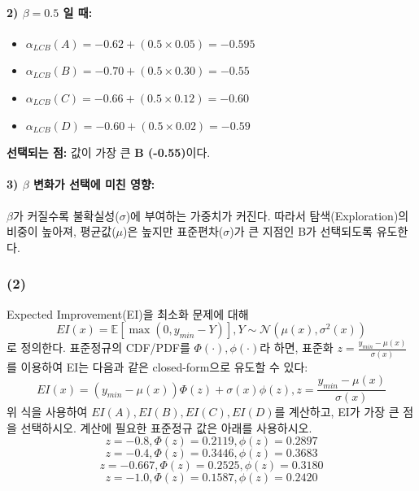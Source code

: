\documentclass[11pt]{article}
\begin{document}
\paragraph{2) $\beta = 0.5$ 일 때:}
\begin{itemize}
    \item $\alpha_{LCB}(A) = -0.62 + (0.5 \times 0.05) = -0.595$
    \item $\alpha_{LCB}(B) = -0.70 + (0.5 \times 0.30) = -0.55$
    \item $\alpha_{LCB}(C) = -0.66 + (0.5 \times 0.12) = -0.60$
    \item $\alpha_{LCB}(D) = -0.60 + (0.5 \times 0.02) = -0.59$
\end{itemize}
\textbf{선택되는 점:} 값이 가장 큰 \textbf{B (-0.55)}이다.

\paragraph{3) $\beta$ 변화가 선택에 미친 영향:}
$\beta$가 커질수록 불확실성($\sigma$)에 부여하는 가중치가 커진다. 따라서 탐색(Exploration)의 비중이 높아져, 평균값($\mu$)은 높지만 표준편차($\sigma$)가 큰 지점인 B가 선택되도록 유도한다.

\subsubsection*{(2)}
Expected Improvement(EI)을 최소화 문제에 대해
\[EI(x)=\mathbb{E}[\max(0, y_{min}-Y)], Y \sim \mathcal{N}(\mu(x), \sigma^2(x))\]
로 정의한다. 표준정규의 CDF/PDF를 $\Phi(\cdot), \phi(\cdot)$라 하면, 표준화 $z=\frac{y_{min}-\mu(x)}{\sigma(x)}$를 이용하여 EI는 다음과 같은 closed-form으로 유도할 수 있다:
\[EI(x)=(y_{min}-\mu(x))\Phi(z)+\sigma(x)\phi(z), z=\frac{y_{min}-\mu(x)}{\sigma(x)}\]
위 식을 사용하여 $EI(A),EI(B),EI(C),EI(D)$를 계산하고, EI가 가장 큰 점을 선택하시오. 계산에 필요한 표준정규 값은 아래를 사용하시오.
\[z=−0.8, \Phi(z)=0.2119, \phi(z)=0.2897\] 
\[z=−0.4, \Phi(z)=0.3446, \phi(z)=0.3683 \]
\[z=−0.667, \Phi(z)=0.2525, \phi(z)=0.3180\] 
\[z=−1.0, \Phi(z)=0.1587, \phi(z)=0.2420\]
\end{document}
